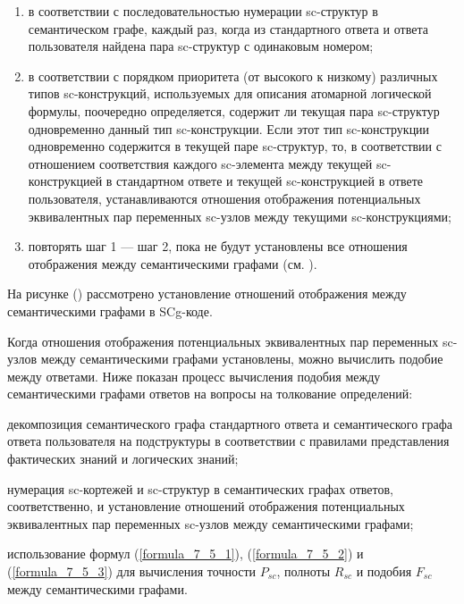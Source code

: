\begin{enumerate}
	\item в соответствии с последовательностью нумерации sc-структур в семантическом графе, каждый раз, когда из стандартного ответа и ответа пользователя найдена пара sc-структур с одинаковым номером;
	\item в соответствии с порядком приоритета (от высокого к низкому) различных типов sc-конструкций, используемых для описания атомарной логической формулы, поочередно определяется, содержит ли текущая пара sc-структур одновременно данный тип sc-конструкции. Если этот тип sc-конструкции одновременно содержится в текущей паре sc-структур, то, в соответствии с отношением соответствия каждого sc-элемента между текущей sc-конструкцией в стандартном ответе и текущей sc-конструкцией в ответе пользователя, устанавливаются отношения отображения потенциальных эквивалентных пар переменных sc-узлов между текущими sc-конструкциями;
	\item повторять шаг 1 --- шаг 2, пока не будут установлены все отношения отображения между семантическими графами (см. ).
\end{enumerate}

На рисунке (\textit{}) рассмотрено установление отношений отображения между семантическими графами в SCg-коде.

Когда отношения отображения потенциальных эквивалентных пар переменных sc-узлов между семантическими графами установлены, можно вычислить подобие между ответами. Ниже показан процесс вычисления подобия между семантическими графами ответов на вопросы на толкование определений:

\begin{textitemize}
	\item декомпозиция семантического графа стандартного ответа и семантического графа ответа пользователя на подструктуры в соответствии с правилами представления фактических знаний и логических знаний;
	\item нумерация sc-кортежей и sc-структур в семантических графах ответов, соответственно, и установление отношений отображения потенциальных эквивалентных пар переменных sc-узлов между семантическими графами;
	\item использование формул (\ref{formula_7_5_1}), (\ref{formula_7_5_2}) и (\ref{formula_7_5_3}) для вычисления точности $P_{sc}$, полноты $R_{sc}$ и подобия $F_{sc}$ между семантическими графами. 
\end{textitemize}

